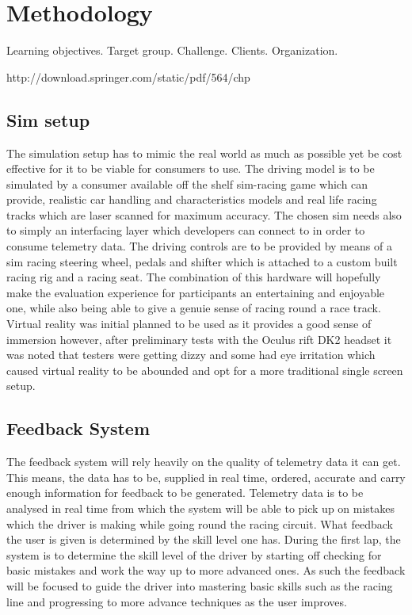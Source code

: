 \section{Methodology}

Learning objectives. 
Target group. 
Challenge.
Clients.
Organization.

http://download.springer.com/static/pdf/564/chp%

\subsection{Sim setup}
	The simulation setup has to mimic the real world as much as possible yet be cost effective for it to be viable for consumers to use. The driving model is to be simulated by a consumer available off the shelf sim-racing game which can provide, realistic car handling and characteristics  models and real life racing tracks which are laser scanned for maximum accuracy. The chosen sim needs also to simply an interfacing layer which developers can connect to in order to consume telemetry data. The driving controls are to be provided by means of a sim racing steering wheel, pedals and shifter which is attached to a custom built racing rig and a racing seat. The combination of this hardware will hopefully make the evaluation experience for participants an entertaining and enjoyable one, while also being able to give a genuie sense of racing round a race track. Virtual reality was initial planned to be used as it provides a good sense of immersion  however, after preliminary tests with the Oculus rift DK2 headset it was noted that testers were getting dizzy and some had eye irritation which caused virtual reality to be abounded and opt for a more traditional single screen setup.

\subsection{Feedback System}
	The feedback system will rely heavily on the quality of telemetry data it can get. This means, the data has to be, supplied in real time, ordered, accurate and carry enough information for feedback to be generated. Telemetry data is to be analysed in real time from which the system will be able to pick up on mistakes which the driver is making while going round the racing circuit. What feedback the user is given is determined by the skill level one has. During the first lap, the system is to determine the skill level of the driver by starting off checking for basic mistakes and work the way up to more advanced ones. As such the feedback will be focused to guide the driver into mastering basic skills such as the racing line and progressing to more advance techniques as the user improves.

